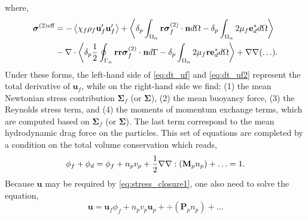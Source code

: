 where,
\begin{align}
    \bm{\sigma}^{(2)\text{eff}} 
    &= 
    - \avg{\chi_f\rho_f \textbf{u}_f'\textbf{u}_f'} 
    + \pavg{\intO{\textbf{r}\bm\sigma^{(2)}_f\cdot \textbf{n}} - \delta_p\intO{2\mu_f\textbf{e}_d^*}}\nonumber\\
    &- \div
        \pavg{ \frac{1}{2}\intS{\textbf{rr}\bm\sigma^{(2)}_f\cdot \textbf{n}}
        - \delta_p\intO{2\mu_f \textbf{r} \textbf{e}_d^*}}
        + \grad\grad (\ldots). 
    \label{eq:def_sigma_eff_f2}
\end{align}
Under these forms, the left-hand side of \ref{eq:dt_uf} and \ref{eq:dt_uf2} represent the total derivative of $\textbf{u}_f$, while on the right-hand side we find: (1) the mean Newtonian stress contribution $\bm\Sigma_f$ (or $\bm\Sigma$), (2) the mean buoyancy force, (3) the Reynolds stress term, and (4) the moments of momentum exchange terms, which are computed based on $\bm\Sigma_f$ (or $\bm\Sigma$). 
The last term correspond to the mean hydrodynamic drag force on the particles.
This set of equations are completed by a condition on the total volume conservation which reads, 
\begin{equation}
    \phi_f + \phi_d = 
    \phi_f +  n_pv_p + \frac{1}{2}\grad\grad : (\textbf{M}_p n_p) + \ldots = 1. 
    \label{eq:volume_conservation}
\end{equation}
Because $\textbf{u}$ may be required by \ref{eq:stress_closure1}, one also need to solve the equation, 
\begin{equation}
    \textbf{u} = \textbf{u}_f\phi_f + 
    n_pv_p\textbf{u}_p + \div  (\textbf{P}_p n_p) + \ldots
    \label{eq:velocity_conservation}
\end{equation}


